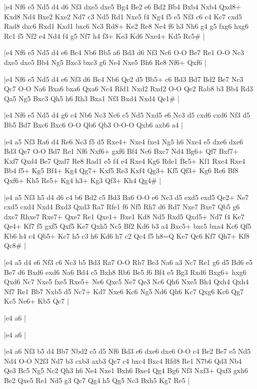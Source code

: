 \whitename{}
\blackname{}
\makegametitle
|e4 Nf6 e5 Nd5 d4 d6 Nf3 dxe5 dxe5 Bg4 Be2 e6 Bd2 Bb4 Bxb4 Nxb4 Qxd8+ Kxd8 Nd4 Bxe2 Kxe2 Nd7 c3 Nd5 Rd1 Nxe5 f4 Ng4 f5 e5 Nf3 c6 c4 Kc7 cxd5 Rad8 dxc6 Rxd1 Kxd1 bxc6 Nc3 Rd8+ Ke2 Re8 Ne4 f6 h3 Nh6 g4 g5 fxg6 hxg6 Rc1 f5 Nf2 e4 Nd4 f4 g5 Nf7 h4 f3+ Ke3 Kd6 Nxe4+ Kd5 Rc5\#  |

\whitename{}
\blackname{}
\makegametitle
|e4 Nf6 e5 Nd5 d4 e6 Bc4 Nb6 Bb5 a6 Bd3 d6 Nf3 Nc6 O-O Be7 Re1 O-O Nc3 dxe5 dxe5 Bb4 Ng5 Bxc3 bxc3 g6 Ne4 Nxe5 Bh6 Re8 Nf6+ Qxf6  |

\whitename{}
\blackname{}
\makegametitle
|e4 Nf6 e5 Nd5 d4 e6 Nf3 d6 Bc4 Nb6 Qe2 d5 Bb5+ c6 Bd3 Bd7 Bd2 Be7 Nc3 Qc7 O-O Na6 Bxa6 bxa6 Qxa6 Nc4 Rfd1 Nxd2 Rxd2 O-O Qe2 Rab8 b3 Bb4 Rd3 Qa5 Ng5 Bxc3 Qh5 h6 Rh3 Bxa1 Nf3 Bxd4 Nxd4 Qe1\#  |

\whitename{}
\blackname{}
\makegametitle
|e4 Nf6 e5 Nd5 d4 g6 c4 Nb6 Nc3 Nc6 c5 Nd5 Nxd5 e6 Nc3 d5 cxd6 cxd6 Nf3 d5 Bb5 Bd7 Bxc6 Bxc6 O-O Qb6 Qb3 O-O-O Qxb6 axb6 a4  |

\whitename{}
\blackname{}
\makegametitle
|e4 a5 Nf3 Ra6 d4 Re6 Nc3 f5 d5 Rxe4+ Nxe4 fxe4 Ng5 h6 Nxe4 e5 dxe6 dxe6 Bd3 Qe7 O-O Bd7 Re1 Nf6 Nxf6+ gxf6 Bf4 Nc6 Bxc7 Nd4 Bg6+ Qf7 Bxf7+ Kxf7 Qxd4 Be7 Qxd7 Re8 Rad1 e5 f4 e4 Rxe4 Kg6 Rde1 Bc5+ Kf1 Rxe4 Rxe4 Bb4 f5+ Kg5 Bf4+ Kg4 Qg7+ Kxf5 Re3 Kxf4 Qg3+ Kf5 Qf3+ Kg6 Re6 Bf8 Qxf6+ Kh5 Re5+ Kg4 h3+ Kg3 Qf3+ Kh4 Qg4\#  |

\whitename{}
\blackname{}
\makegametitle
|e4 a5 Nf3 h5 d4 d6 c4 b6 Bd2 c5 Bd3 Ba6 O-O e6 Nc3 d5 exd5 exd5 Qe2+ Ne7 cxd5 cxd4 Nxd4 Bxd3 Qxd3 Ra7 Rfe1 f6 Nf5 Rh7 d6 Rd7 Nxe7 Bxe7 Qb5 g6 dxe7 Rhxe7 Rxe7+ Qxe7 Re1 Qxe1+ Bxe1 Kd8 Nd5 Rxd5 Qxd5+ Nd7 f4 Ke7 Qe4+ Kf7 f5 gxf5 Qxf5 Ke7 Qxh5 Nc5 Bf2 Kd6 b3 a4 Bxc5+ bxc5 bxa4 Kc6 Qf5 Kb6 h4 c4 Qb5+ Kc7 h5 c3 h6 Kd6 h7 c2 Qc4 f5 h8=Q Ke7 Qc6 Kf7 Qh7+ Kf8 Qc8\#  |

\whitename{}
\blackname{}
\makegametitle
|e4 a5 d4 e6 Nf3 c6 Nc3 b5 Bd3 Ra7 O-O Rb7 Be3 Na6 a3 Nc7 Re1 g6 d5 Bd6 e5 Be7 d6 Bxd6 exd6 Na6 Bd4 c5 Bxh8 Rb6 Be5 f6 Bf4 e5 Bg3 Rxd6 Bxg6+ hxg6 Qxd6 Nc7 Nxe5 fxe5 Rxe5+ Ne6 Qxc5 Ne7 Qe3 Nc6 Qh6 Nxe5 Bh4 Qxh4 Qxh4 Nf7 Re1 Bb7 Nxb5 d5 Nc7+ Kd7 Nxe6 Kc6 Ng5 Nd6 Qh6 Kc7 Qxg6 Kc6 Qg7 Kc5 Ne6+ Kb5 Qc7  |

\whitename{}
\blackname{}
\makegametitle
|e4 a6  |

\whitename{}
\blackname{}
\makegametitle
|e4 a6  |

\whitename{}
\blackname{}
\makegametitle
|e4 a6 Nf3 b5 d4 Bb7 Nbd2 c5 d5 Nf6 Bd3 e6 dxe6 dxe6 O-O c4 Be2 Be7 e5 Nd5 Nd4 O-O N2f3 Nd7 b3 cxb3 axb3 Qc7 c4 bxc4 Bxc4 Rfd8 Re1 N7b6 Qd3 Nb4 Qe3 Bc5 Ng5 Nc2 Qh3 h6 Ne4 Nxe1 Bxh6 Bxe4 Qg4 Bg6 Nf3 Nxf3+ Qxf3 gxh6 Be2 Qxe5 Re1 Nd5 g3 Qc7 Qg4 h5 Qg5 Nc3 Bxh5 Kg7 Re5  |

